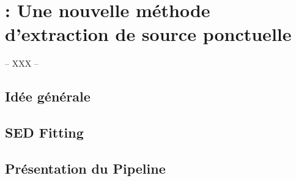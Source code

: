\documentclass[../main/main.tex]{subfiles}
\begin{document}
\chapter{\hypergal : Une nouvelle méthode d'extraction de source ponctuelle}\label{ch:hypergal}

-- XXX --

\minitoc
\newpage

\section{Idée générale}

\section{SED Fitting}

\section{Présentation du Pipeline}
\end{document}
